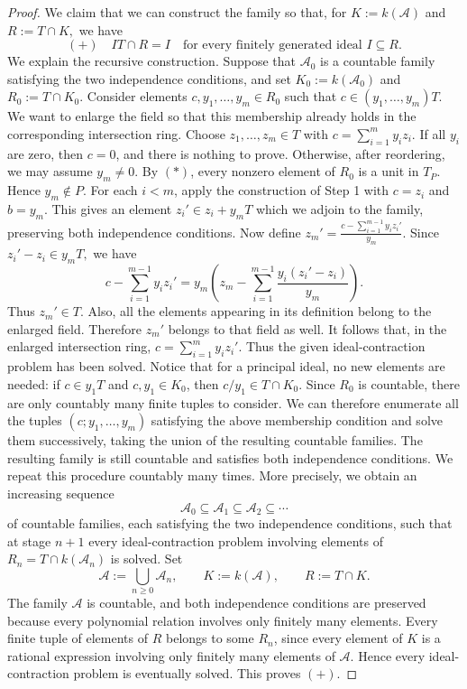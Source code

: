 \documentclass[11pt,a4paper]{amsart}
\numberwithin{equation}{section}
\begin{document}
\begin{proof}
	\medskip
	\noindent	{}
We claim that we can construct the family so that, for	$	K:=k(\mathcal A)$ and $R:=T\cap K,$	we have	$$(+)\quad		IT\cap  R=I		\quad\text{for every finitely generated ideal }I\subseteq R.	$$
		We explain the recursive construction.
Suppose that $\mathcal A_0$ is a countable family satisfying
	the two independence conditions, and set
$K_0:=k(\mathcal A_0)$ and $ R_0:=T\cap K_0.$
	Consider elements
$	c,y_1,\ldots,y_m\in R_0$	such that
$	c\in(y_1,\ldots,y_m)T.$
	We want to enlarge the field so that this membership already
	holds in the corresponding intersection ring.
Choose $z_1,\ldots,z_m\in T$ with
$	c=\sum_{i=1}^m y_iz_i.$
If all $y_i$ are zero, then $c=0$, and there is nothing to prove.
Otherwise, after reordering, we may assume $y_m\neq0$.
By $(\ast)$, every nonzero element of $R_0$ is a	unit in $T_P$. Hence
$y_m\notin P.$
For each $i<m$, apply the construction of Step 1 with	$	c=z_i$ and $b=y_m.	$
	This gives an element
$z_i'\in z_i+y_mT$
	which we adjoin to the family, preserving both independence
	conditions.
	Now define
$	z_m'=	\frac{c-\sum_{i=1}^{m-1}y_iz_i'}{y_m}.$	Since
$	z_i'-z_i\in y_mT,$	we have	\[	c-\sum_{i=1}^{m-1}y_iz_i'	=	y_m\left(z_m-\sum_{i=1}^{m-1}	\frac{y_i(z_i'-z_i)}{y_m}\right).	\]	Thus $z_m'\in T$. Also, all the elements appearing in its	definition belong to the enlarged field. Therefore $z_m'$	belongs to that field as well.
It follows that, in the enlarged intersection ring,	$c=\sum_{i=1}^m y_iz_i'.$	Thus the given ideal-contraction problem has been solved.
Notice that for a principal ideal, no new elements are needed:	if $c\in y_1T$ and $c,y_1\in K_0$, then	$c/y_1\in T\cap K_0$.
Since $R_0$ is countable, there are only countably many finite
	tuples to consider. We can therefore enumerate all the tuples
$	(c;y_1,\ldots,y_m)$	satisfying the above membership condition and solve them	successively, taking the union of the resulting countable	families. The resulting family is still countable and satisfies	both independence conditions.
We repeat this procedure countably many times. More precisely,	we obtain an increasing sequence	\[	\mathcal A_0\subseteq\mathcal A_1	\subseteq\mathcal A_2\subseteq\cdots	\]	of countable families, each satisfying the two independence	conditions, such that at stage $n+1$ every ideal-contraction	problem involving elements of
$	R_n=T\cap k(\mathcal A_n)$
is solved.
Set
	\[
	\mathcal A:=\bigcup_{n\geq0}\mathcal A_n,
	\qquad
	K:=k(\mathcal A),
	\qquad
	R:=T\cap K.
	\]
The family $\mathcal A$ is countable, and both independence
conditions are preserved because every polynomial relation
involves only finitely many elements.
Every finite tuple of elements of $R$ belongs to some $R_n$,
since every element of $K$ is a rational expression involving
only finitely many elements of $\mathcal A$. Hence every
ideal-contraction problem is eventually solved. This proves
$(+)$.


\end{proof}
\end{document}
